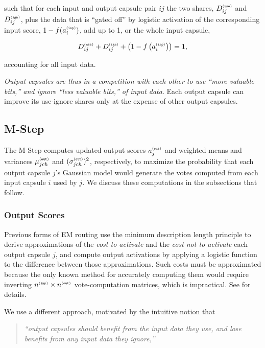 \documentclass[11pt,a4paper]{article}
\newcommand{\suptag}[1]{^{{\scriptscriptstyle\tt (#1)}}}
\begin{document}
such that for each input and output capsule pair $ij$ the two shares, $D\suptag{use}_{ij}$ and $D\suptag{ign}_{ij}$, plus the data that is ``gated off'' by logistic activation of the corresponding input score, $1 - f(a\inp_i)$, add up to 1, or the whole input capsule,

\begin{equation}\label{equation_for_D_use_D_ign_fainp}
D\suptag{use}_{ij} + D\suptag{ign}_{ij} + \left( 1 - f \left( a\inp_i \right) \right) = 1,
\end{equation}

accounting for all input data.

{\em Output capsules are thus in a competition with each other to use ``more valuable bits,'' and ignore ``less valuable bits,'' of input data}. Each output capsule can improve its use-ignore shares only at the expense of other output capsules. 

\subsection{M-Step}\label{ssec:M_Step}

The M-Step computes updated output scores $a\out_j$ and weighted means and variances $\mu\out_{jch}$ and $(\sigma\out_{jch})^2$, respectively, to maximize the probability that each output capsule $j$'s Gaussian model would generate the votes computed from each input capsule $i$ used by $j$. We discuss these computations in the subsections that follow.

\subsubsection{Output Scores}

Previous forms of EM routing use the minimum description length principle to derive approximations of the \emph{cost to activate} and the \emph{cost not to activate} each output capsule $j$, and compute output activations by applying a logistic function to the difference between those approximations. Such costs must be approximated because the only known method for accurately computing them would require inverting $n\inp \times n\out$ vote-computation matrices, which is impractical. See \citet{46653} for details.

We use a different approach, motivated by the intuitive notion that

\begin{quote}
	\emph{``output capsules should benefit from the input data they use, and lose benefits from any input data they ignore,''}
\end{quote}
\end{document}
